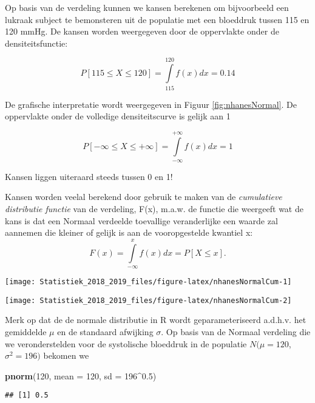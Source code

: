\documentclass[12pt,dutch,coursenotes]{book}
\newenvironment{Shaded}{\begin{snugshade}}{\end{snugshade}}
\newcommand{\KeywordTok}[1]{\textcolor[rgb]{0.13,0.29,0.53}{\textbf{#1}}}
\newcommand{\DataTypeTok}[1]{\textcolor[rgb]{0.13,0.29,0.53}{#1}}
\newcommand{\DecValTok}[1]{\textcolor[rgb]{0.00,0.00,0.81}{#1}}
\newcommand{\FloatTok}[1]{\textcolor[rgb]{0.00,0.00,0.81}{#1}}
\newcommand{\OperatorTok}[1]{\textcolor[rgb]{0.81,0.36,0.00}{\textbf{#1}}}
\newcommand{\NormalTok}[1]{#1}
\theoremstyle{definition}
\theoremstyle{definition}
\theoremstyle{definition}
\theoremstyle{remark}
\begin{document}
Op basis van de verdeling kunnen we kansen berekenen om bijvoorbeeld een
lukraak subject te bemonsteren uit de populatie met een bloeddruk tussen
115 en 120 mmHg. De kansen worden weergegeven door de oppervlakte onder
de densiteitsfunctie:

\[P[115\leq  X\leq 120]= \int\limits_{115}^{120} f(x) dx = 0.14\]

De grafische interpretatie wordt weergegeven in Figuur
\ref{fig:nhanesNormal}. De oppervlakte onder de volledige
densiteitscurve is gelijk aan 1

\[P[-\infty\leq X \leq +\infty]=\int\limits_{-\infty}^{+\infty} f(x) dx=1\]

Kansen liggen uiteraard steeds tussen 0 en 1!

Kansen worden veelal berekend door gebruik te maken van de
\emph{cumulatieve distributie functie} van de verdeling, F(x), m.a.w. de
functie die weergeeft wat de kans is dat een Normaal verdeelde
toevallige veranderlijke een waarde zal aannemen die kleiner of gelijk
is aan de vooropgestelde kwantiel x:
\[F(x)=\int\limits_{-\infty}^x f(x) dx  = P[X\leq x].\]

\begin{center}\texttt{[image: Statistiek\_2018\_2019\_files/figure-latex/nhanesNormalCum-1]} \end{center}

\begin{center}\texttt{[image: Statistiek\_2018\_2019\_files/figure-latex/nhanesNormalCum-2]} \end{center}

Merk op dat de de normale distributie in R wordt geparameteriseerd
a.d.h.v. het gemiddelde \(\mu\) en de standaard afwijking \(\sigma\). Op
basis van de Normaal verdeling die we veronderstelden voor de
systolische bloeddruk in de populatie \(N(\mu=120\),\(\sigma^2=196)\)
bekomen we

\begin{Shaded}
\begin{Highlighting}[]
\KeywordTok{pnorm}\NormalTok{(}\DecValTok{120}\NormalTok{, }\DataTypeTok{mean =} \DecValTok{120}\NormalTok{, }\DataTypeTok{sd =} \DecValTok{196}\OperatorTok{^}\FloatTok{0.5}\NormalTok{)}
\end{Highlighting}
\end{Shaded}

\begin{verbatim}
## [1] 0.5
\end{verbatim}
\end{document}

